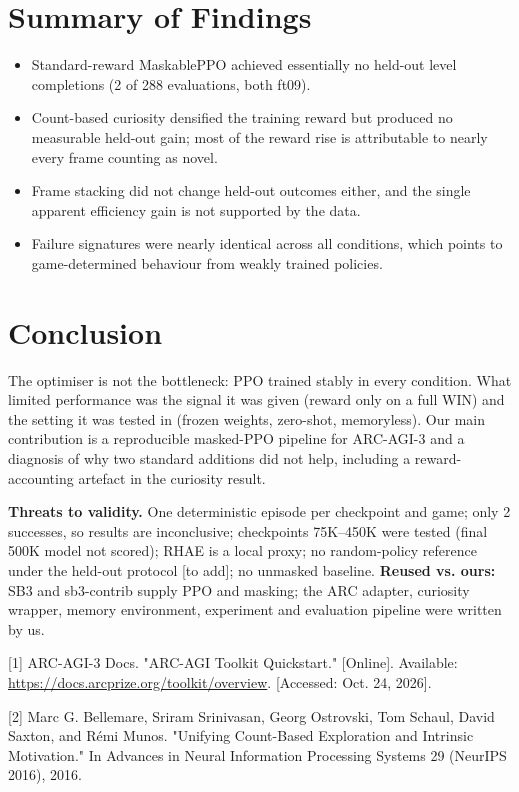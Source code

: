 \documentclass[11pt,a4paper]{article}
\begin{document}
\section{Summary of Findings}

\begin{itemize}
  \item Standard-reward MaskablePPO achieved essentially no held-out level completions (2 of 288 evaluations, both ft09).
  \item Count-based curiosity densified the training reward but produced no measurable held-out gain; most of the reward rise is attributable to nearly every frame counting as novel.
  \item Frame stacking did not change held-out outcomes either, and the single apparent efficiency gain is not supported by the data.
  \item Failure signatures were nearly identical across all conditions, which points to game-determined behaviour from weakly trained policies.
\end{itemize}

\section{Conclusion}

The optimiser is not the bottleneck: PPO trained stably in every condition. What limited performance was the signal it was given (reward only on a full WIN) and the setting it was tested in (frozen weights, zero-shot, memoryless). Our main contribution is a reproducible masked-PPO pipeline for ARC-AGI-3 and a diagnosis of why two standard additions did not help, including a reward-accounting artefact in the curiosity result.

\textbf{Threats to validity.} One deterministic episode per checkpoint and game; only 2 successes, so results are inconclusive; checkpoints 75K--450K were tested (final 500K model not scored); RHAE is a local proxy; no random-policy reference under the held-out protocol [to add]; no unmasked baseline. \textbf{Reused vs. ours:} SB3 and sb3-contrib supply PPO and masking; the ARC adapter, curiosity wrapper, memory environment, experiment and evaluation pipeline were written by us.

[1] ARC-AGI-3 Docs. "ARC-AGI Toolkit Quickstart."
    [Online]. Available: \url{https://docs.arcprize.org/toolkit/overview}.
    [Accessed: Oct. 24, 2026].

[2] Marc G. Bellemare, Sriram Srinivasan, Georg Ostrovski, Tom Schaul,
    David Saxton, and Rémi Munos. "Unifying Count-Based Exploration
    and Intrinsic Motivation." In Advances in Neural Information
    Processing Systems 29 (NeurIPS 2016), 2016.
\end{document}
